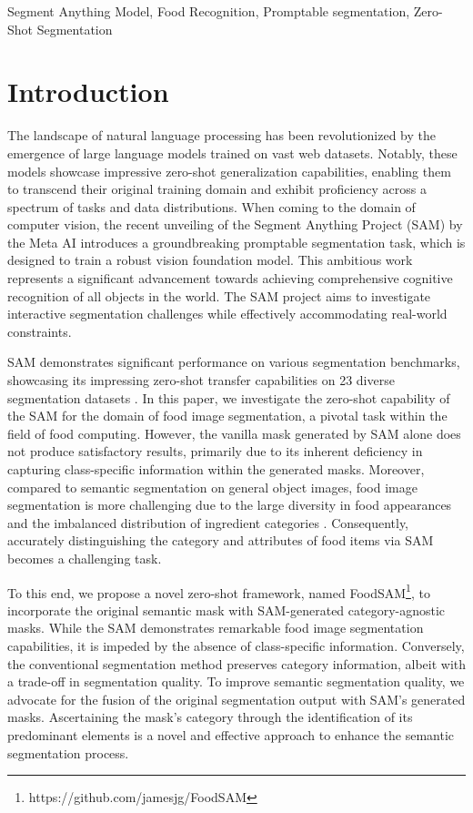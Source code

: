 \documentclass[lettersize,journal]{IEEEtran}
\begin{document}
\begin{IEEEkeywords}
Segment Anything Model, Food Recognition, Promptable segmentation, Zero-Shot Segmentation
\end{IEEEkeywords}



\section{Introduction}

The landscape of natural language processing \cite{wolf2019huggingface, ruder2019transfer, qiu2020pre} has been revolutionized by the emergence of large language models \cite{kasneci2023chatgpt, wei2022emergent, wei2022chain} trained on vast web datasets.
Notably, these models showcase impressive zero-shot generalization capabilities, enabling them to transcend their original training domain and exhibit proficiency across a spectrum of tasks and data distributions.
When coming to the domain of computer vision, the recent unveiling of the Segment Anything Project (SAM) by the Meta AI \cite{kirillov2023segment} 
introduces a groundbreaking promptable segmentation task, which is designed to train a robust vision foundation model. 
This ambitious work represents a significant advancement towards achieving comprehensive cognitive recognition of all objects in the world. 
The SAM project aims to investigate interactive segmentation challenges while effectively accommodating real-world constraints.

SAM demonstrates significant performance on various segmentation benchmarks, 
showcasing its impressing zero-shot transfer capabilities on 23 diverse segmentation datasets \cite{kirillov2023segment}.
In this paper, we investigate the zero-shot capability of the SAM for the domain of food image segmentation, a pivotal task within the field of food computing\cite{10.1145/3600095, zhou2019application, zhu2021deep}.
However, the vanilla mask generated by SAM alone does not produce satisfactory results, primarily due to its inherent deficiency in capturing class-specific information within the generated masks.
Moreover, compared to semantic segmentation on general object images, food image segmentation is more challenging due to the large diversity in food appearances and the imbalanced distribution of ingredient categories \cite{wu2021large}.
Consequently, accurately distinguishing the category and attributes of food items via SAM becomes a challenging task.

To this end, we propose a novel zero-shot framework, named FoodSAM\footnote{https://github.com/jamesjg/FoodSAM}, to incorporate the original semantic mask with SAM-generated category-agnostic masks.
While the SAM demonstrates remarkable food image segmentation capabilities, it is impeded by the absence of class-specific information.
Conversely, the conventional segmentation method preserves category information, albeit with a trade-off in segmentation quality.
To improve semantic segmentation quality, we advocate for the fusion of the original segmentation output with SAM's generated masks. 
Ascertaining the mask's category through the identification of its predominant elements is a novel and effective approach to enhance the semantic segmentation process.
\end{document}
